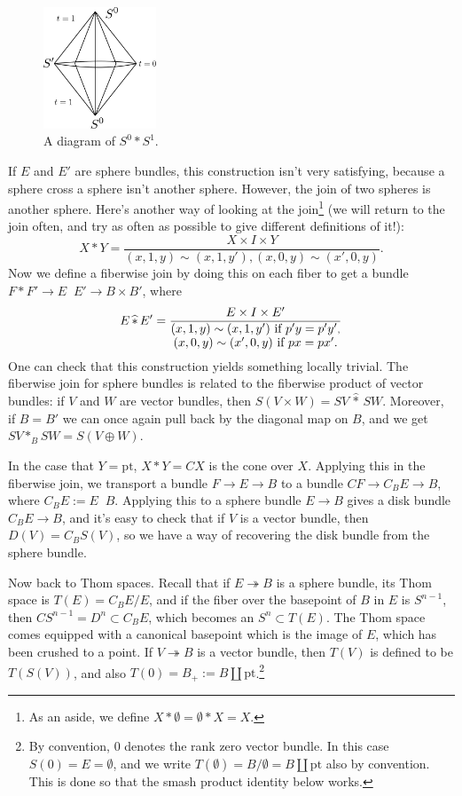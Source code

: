\documentclass{article}
\newcommand{\pt}[1]{#1_+}
\newcommand{\ptspace}{\mathrm{pt}}
\newcommand{\onto}{\twoheadrightarrow}
\renewcommand{\to}{\longrightarrow}
\theoremstyle{definition}
\begin{document}
\begin{figure} %
\centering\includegraphics[width=0.3\textwidth]{figures/fig9.pdf}
\caption{\small A diagram of $S^0 \ast S^1$.}
\end{figure}
If $E$ and $E'$ are sphere bundles, this construction isn't very satisfying, because a sphere cross a sphere isn't another sphere.  However, the join of two spheres is another sphere.  Here's another way of looking at the join\footnote{As an aside, we define $X \ast \emptyset = \emptyset \ast X = X$.} (we will return to the join often, and try as often as possible to give different definitions of it!):
\[
X \ast Y = \frac{X \times I \times Y}{(x, 1, y) \sim (x, 1, y'), (x, 0, y) \sim (x', 0, y)}.
\]
Now we define a fiberwise join by doing this on each fiber to get a bundle $F \ast F' \to E\mathop{\widehat\ast}E' \to B \times B'$, where \[E\mathop{\widehat\ast}E' = \frac{E \times I \times E'}{\substack{\hbox{$(x, 1, y) \sim (x, 1, y')$ if $p'y = p'y'$}, \\ \hbox{$(x, 0, y) \sim (x', 0, y)$ if $px = px'$.}}}\]  One can check that this construction yields something locally trivial.  The fiberwise join for sphere bundles is related to the fiberwise product of vector bundles: if $V$ and $W$ are vector bundles, then $S(V \times W) = SV \,\widehat \ast \,SW$.  Moreover, if $B = B'$ we can once again pull back by the diagonal map on $B$, and we get $SV \ast_B SW = S(V \oplus W)$.

In the case that $Y = \ptspace$, $X \ast Y = CX$ is the cone over $X$.  Applying this in the fiberwise join, we transport a bundle $F \to E \to B$ to a bundle $CF \to C_B E \to B$, where $C_BE:=E\mathop{\widehat\ast}B$.  Applying this to a sphere bundle $E \to B$ gives a disk bundle $C_B E \to B$, and it's easy to check that if $V$ is a vector bundle, then $D(V) = C_B S(V)$, so we have a way of recovering the disk bundle from the sphere bundle.

Now back to Thom spaces.  Recall that if $E \onto B$ is a sphere bundle, its Thom space is $T(E) = C_B E / E$, and if the fiber over the basepoint of $B$ in $E$ is $S^{n-1}$, then $CS^{n-1} = D^n \subset C_B E$, which becomes an $S^n \subset T(E)$.  The Thom space comes equipped with a canonical basepoint which is the image of $E$, which has been crushed to a point.  If $V \onto B$ is a vector bundle, then $T(V)$ is defined to be $T(S(V))$, and also $T(0) = \pt{B}:=B \amalg \ptspace$.\footnote{By convention, $0$ denotes the rank zero vector bundle.  In this case $S(0) = E = \emptyset$, and we write $T(\emptyset) = B / \emptyset = B \amalg \ptspace$ also by convention.  This is done so that the smash product identity below works.}
\end{document}
